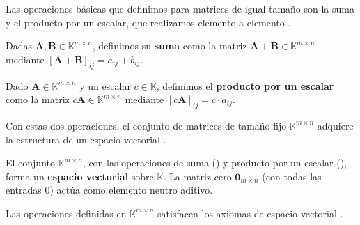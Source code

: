 Las operaciones básicas que definimos para matrices de igual tamaño son la suma y el producto por un escalar, que realizamos elemento a elemento \citep{Strang2016}.

\begin{definition}
\label{def:matrix_sum_general}
Dadas $\mathbf{A}, \mathbf{B} \in \mathbb{K}^{m \times n}$, definimos su \textbf{suma} como la matriz $\mathbf{A}+\mathbf{B} \in \mathbb{K}^{m \times n}$ mediante $[\mathbf{A}+\mathbf{B}]_{ij} = a_{ij} + b_{ij}$.
\end{definition}

\begin{definition}
\label{def:scalar_product_general}
Dado $\mathbf{A} \in \mathbb{K}^{m \times n}$ y un escalar $c \in \mathbb{K}$, definimos el \textbf{producto por un escalar} como la matriz $c\mathbf{A} \in \mathbb{K}^{m \times n}$ mediante $[c\mathbf{A}]_{ij} = c \cdot a_{ij}$.
\end{definition}

Con estas dos operaciones, el conjunto de matrices de tamaño fijo $\mathbb{K}^{m \times n}$ adquiere la estructura de un espacio vectorial \citep{Noble1988}.

\begin{definition}
\label{def:matrix_vector_space_general}
El conjunto $\mathbb{K}^{m \times n}$, con las operaciones de suma () y producto por un escalar (), forma un \textbf{espacio vectorial} sobre $\mathbb{K}$. La matriz cero $\mathbf{0}_{m \times n}$ (con todas las entradas $0$) actúa como elemento neutro aditivo.
\end{definition}

\begin{proposition}
Las operaciones definidas en $\mathbb{K}^{m \times n}$ satisfacen los axiomas de espacio vectorial \citep{Strang2016}.
\end{proposition}

